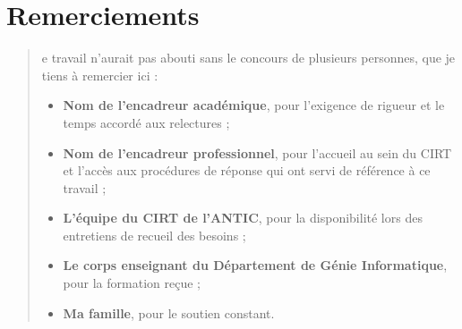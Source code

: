 \chapter*{Remerciements}
\begin{SingleSpace}
\begin{quote}
e travail n'aurait pas abouti sans le concours de plusieurs personnes,
que je tiens \`a remercier ici :

\begin{itemize}
  \item \textbf{Nom de l'encadreur acad\'emique}, pour l'exigence de rigueur et le
        temps accord\'e aux relectures ;
  \item \textbf{Nom de l'encadreur professionnel}, pour l'accueil au sein du CIRT et
        l'acc\`es aux proc\'edures de r\'eponse qui ont servi de r\'ef\'erence \`a ce travail ;
  \item \textbf{L'\'equipe du CIRT de l'ANTIC}, pour la disponibilit\'e lors des
        entretiens de recueil des besoins ;
  \item \textbf{Le corps enseignant du D\'epartement de G\'enie Informatique}, pour la
        formation re\c cue ;
  \item \textbf{Ma famille}, pour le soutien constant.
\end{itemize}
\end{quote}
\end{SingleSpace}
\clearpage
